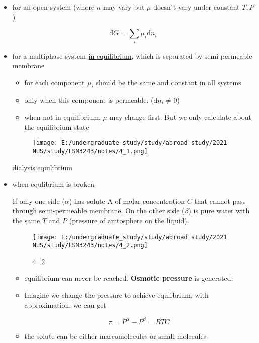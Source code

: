 \documentclass[]{article}
\begin{document}
\begin{itemize}
\item
  for an open system (where \(n\) may vary but \(\mu\) doesn't vary
  under constant \(T,P\))

  \[\mathrm{d}G=\sum_i \mu_i\mathrm{d} n_i\]
\item
  for a multiphase system \underline{in equilibrium}, which is separated
  by semi-permeable membrane

  \begin{itemize}
  \item
    for each component \(\mu_i\) should be the same and constant in all
    systems 
  \item
    only when this component is permeable. (\(\mathrm{d} n_i\neq 0\)) 
  \item
    when not in equilibrium, \(\mu\) may change first. But we only
    calculate about the equilibrium state 
  \end{itemize}

  \begin{figure}
  \centering
  \texttt{[image: E:/undergraduate\_study/study/abroad study/2021 NUS/study/LSM3243/notes/4\_1.png]}
  \caption{}
  \end{figure}

  dialysis equilibrium
\item
  when equlibrium is broken

  If only one side (\(\alpha\)) has solute A of molar concentration
  \(C\) that cannot pass through semi-permeable membrane. On the other
  side (\(\beta\)) is pure water with the same \(T\) and \(P\) (pressure
  of amtosphere on the liquid).

  \begin{figure}
  \centering
  \texttt{[image: E:/undergraduate\_study/study/abroad study/2021 NUS/study/LSM3243/notes/4\_2.png]}
  \caption{4\_2}
  \end{figure}

  \begin{itemize}
  \item
    equilibrium can never be reached. \textbf{Osmotic pressure} is
    generated. 
  \item
    Imagine we change the pressure to achieve equlibrium, with
    approximation, we can get

    \[\pi=P^\alpha-P^\beta=RTC\]
  \item
    the solute can be either marcomolecules or small molecules
  \end{itemize}
\end{itemize}
\end{document}
